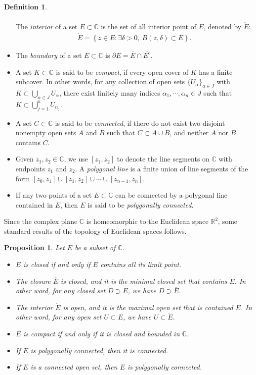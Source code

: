 \documentclass{article}
\numberwithin{equation}{section}
\newcommand{\bbC}{\mathbb{C}}
\newcommand{\bbR}{\mathbb{R}}
\newcommand{\ol}{\overline}
\theoremstyle{plain}
\newtheorem{proposition}[theorem]{Proposition}
\theoremstyle{definition}
\newtheorem{definition}[theorem]{Definition}
\begin{document}
\begin{definition}
\begin{itemize}
\begin{align*}
\end{align*}
The \textit{interior} of a set $E\subset\bbC$ is the set of all interior point of $E$, denoted by $\mathring{E}$:
\begin{align*}
	\mathring{E}=\left\{z\in E:\exists\delta>0,\ B(z,\delta)\subset E\right\}.
\end{align*}
\item[(vi)] The \textit{boundary} of a set $E\subset\bbC$ is $\partial E=\ol{E}\cap\ol{E^c}$.
\item[(vii)] A set $K\subset\bbC$ is said to be \textit{compact}, if every open cover of $K$ has a finite subcover. In other words, for any collection of open sets $\{U_\alpha\}_{\alpha\in J}$ with $K\subset\bigcup_{\alpha\in J}U_\alpha$, there exist finitely many indices $\alpha_1,\cdots,\alpha_n\in J$ such that $K\subset\bigcup_{j=1}^n U_{\alpha_j}$.
\item[(viii)] A set $C\subset\bbC$ is said to be \textit{connected}, if there do not exist two disjoint nonempty open sets $A$ and $B$ such that $C\subset A\cup B$, and neither $A$ nor $B$ contains $C$. 
\item[(ix)] Given $z_1,z_2\in\bbC$, we use $[z_1,z_2]$ to denote the line segments on $\bbC$ with endpoints $z_1$ and $z_2$. A \textit{polygonal line} is a finite union of line segments of the form $[z_0,z_1]\cup[z_1,z_2]\cup\cdots\cup[z_{n-1},z_n]$. 
\item[(x)] If any two points of a set $E\subset\bbC$ can be connected by a polygonal line contained in $E$, then $E$ is said to be \textit{polygonally connected}.
\end{itemize}
\end{definition}
Since the complex plane $\bbC$ is homeomorphic to the Euclidean space $\bbR^2$, some standard results of the topology of Euclidean spaces follows.
\begin{proposition}\label{prop:1.2}
Let $E$ be a subset of $\bbC$.
\begin{itemize}
\item[(i)] $E$ is closed if and only if $E$ contains all its limit point.
\item[(ii)] The closure $\ol{E}$ is closed, and it is the minimal closed set that contains $E$. In other word, for any closed set $D\supset E$, we have $D\supset\ol{E}$.
\item[(iii)] The interior $\mathring{E}$ is open, and it is the maximal open set that is contained $E$. In other word, for any open set $U\subset E$, we have $U\subset\mathring{E}$.
\item[(iv)] $E$ is compact if and only if it is closed and bounded in $\bbC$.
\item[(v)] If $E$ is polygonally connected, then it is connected.
\item[(vi)] If $E$ is a connected open set, then $E$ is polygonally connected.
\end{itemize}
\end{proposition}
\end{document}
